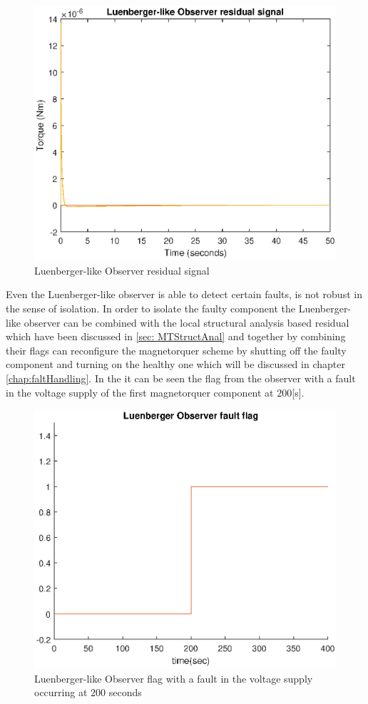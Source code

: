 \begin{figure}[H]
	\centering
	\includegraphics[width=0.9\linewidth]{figures/Observer_residual}
	\caption{Luenberger-like Observer residual signal }
	\label{fig:observerresidual}
\end{figure}
%
 Even the Luenberger-like observer is able to detect certain faults, is not robust in the sense of isolation. In order to isolate the faulty component the  Luenberger-like observer can be combined with the local structural analysis based residual which have been discussed in \ref{sec: MTStructAnal} and together by combining their flags can reconfigure the magnetorquer scheme by shutting off the faulty component and turning on the healthy one which will be discussed in chapter \ref{chap:faltHandling}. In the  it can be seen the flag from the observer with a fault in the voltage supply of the first magnetorquer component at $200$[s]. 
 \begin{figure}[H]
 	\centering
 	\includegraphics[width=0.9\linewidth]{figures/Luenberger_Observerflag}
 	\caption{Luenberger-like Observer flag with a fault in the voltage supply occurring at 200 seconds   }
 	\label{fig:obsflag}
 \end{figure}

%